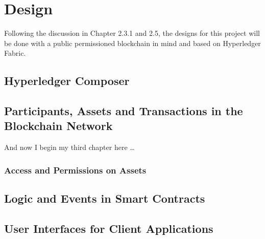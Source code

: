 \chapter{Design}

Following the discussion in Chapter 2.3.1 and 2.5, the designs for this project 
will be done with a public permissioned blockchain in mind and based on 
Hyperledger Fabric.

\section*{Hyperledger Composer}

\section{Participants, Assets and Transactions in the Blockchain Network}
And now I begin my third chapter here \dots

\subsection{Access and Permissions on Assets}

\section{Logic and Events in Smart Contracts}

\section{User Interfaces for Client Applications}